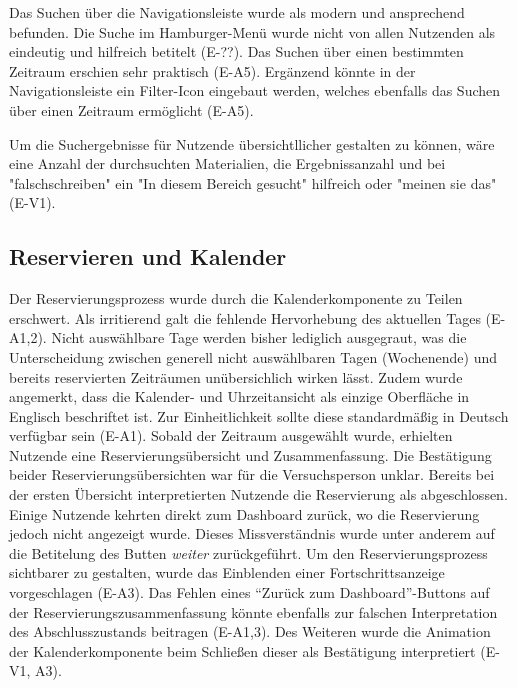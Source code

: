 Das Suchen über die Navigationsleiste wurde als modern und ansprechend befunden. Die
Suche im Hamburger-Menü wurde nicht von allen Nutzenden als eindeutig und hilfreich
betitelt (E-??). Das Suchen über einen bestimmten Zeitraum erschien sehr praktisch
(E-A5). Ergänzend könnte in der Navigationsleiste ein Filter-Icon eingebaut
werden, welches ebenfalls das Suchen über einen Zeitraum ermöglicht (E-A5).

Um die Suchergebnisse für Nutzende übersichtllicher gestalten zu können, wäre eine Anzahl der
durchsuchten Materialien, die Ergebnissanzahl und bei "falschschreiben" ein "In diesem Bereich gesucht"
hilfreich oder "meinen sie das" (E-V1). 

\subsection{Reservieren und Kalender}
Der Reservierungsprozess wurde durch die Kalenderkomponente zu Teilen erschwert. Als irritierend
galt die fehlende Hervorhebung des aktuellen Tages (E-A1,2). Nicht auswählbare Tage werden bisher
lediglich ausgegraut, was die Unterscheidung zwischen generell nicht auswählbaren Tagen (Wochenende)
und bereits reservierten Zeiträumen unübersichlich wirken lässt. Zudem wurde angemerkt, dass die
Kalender- und Uhrzeitansicht als einzige Oberfläche in Englisch beschriftet ist. Zur Einheitlichkeit
sollte diese standardmäßig in Deutsch verfügbar sein (E-A1). Sobald der Zeitraum ausgewählt wurde,
erhielten Nutzende eine Reservierungsübersicht und Zusammenfassung. Die Bestätigung beider
Reservierungsübersichten war für die Versuchsperson unklar. Bereits bei der ersten Übersicht
interpretierten Nutzende die Reservierung als abgeschlossen. Einige Nutzende kehrten direkt zum
Dashboard zurück, wo die Reservierung jedoch nicht angezeigt wurde. Dieses Missverständnis wurde
unter anderem auf die Betitelung des Butten \textit{weiter} zurückgeführt. Um den
Reservierungsprozess sichtbarer zu gestalten, wurde das Einblenden einer Fortschrittsanzeige
vorgeschlagen (E-A3). Das Fehlen eines \enquote{Zurück zum Dashboard}-Buttons auf der
Reservierungszusammenfassung könnte ebenfalls zur falschen Interpretation des Abschlusszustands
beitragen (E-A1,3). Des Weiteren wurde die Animation der Kalenderkomponente beim Schließen dieser als
Bestätigung interpretiert (E-V1, A3).


